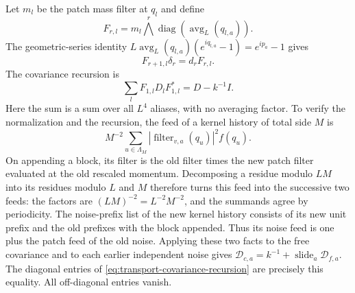 Let $m_l$ be the patch mass filter at $q_l$ and define
\[
 F_{r,l}=m_l\bigwedge^r\operatorname{diag}
                 (\operatorname{avg}_L(q_{l,a})).
\]
The geometric-series identity
$L\operatorname{avg}_L(q_{l,a})(e^{iq_{l,a}}-1)=e^{ip_a}-1$
gives
\begin{equation}\label{eq:transport-filter-chain}
 F_{r+1,l}\delta_r=d_rF_{r,l}.
\end{equation}
The covariance recursion is
\begin{equation}\label{eq:transport-covariance-recursion}
                  \sum_l F_{1,l}D_lF_{1,l}^*=D-k^{-1}I.
\end{equation}
Here the sum is a sum over all $L^4$ aliases, with no averaging
factor. To verify the normalization and the recursion, the feed of a
kernel history of total side $M$ is
\[
 M^{-2}\sum_{u\in\Lambda_M}
 |\operatorname{filter}_{v,a}(q_u)|^2 f(q_u).
\]
On appending a block, its filter is the old filter times the new
patch filter evaluated at the old rescaled momentum. Decomposing a
residue modulo $LM$ into its residues modulo $L$ and $M$ therefore
turns this feed into the successive two feeds: the factors are
$(LM)^{-2}=L^{-2}M^{-2}$, and the summands agree by periodicity.
The noise-prefix list of the new kernel history consists of its new unit
prefix and the old prefixes with the block appended. Thus its noise
feed is one plus the patch feed of the old noise. Applying these two
facts to the free covariance and to each earlier independent noise
gives $\mathscr D_{c,a}=k^{-1}+\operatorname{slide}_a\mathscr D_{f,a}$.
The diagonal entries of \eqref{eq:transport-covariance-recursion}
are precisely this equality. All off-diagonal entries vanish.

